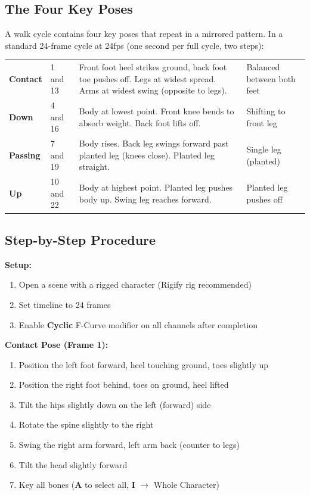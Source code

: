 \subsection{The Four Key Poses}

A walk cycle contains four key poses that repeat in a mirrored pattern. In a standard 24-frame cycle at 24fps (one second per full cycle, two steps):

\begin{center}
\begin{tabularx}{\textwidth}{L{2cm}C{1.5cm}L{4.5cm}X}
\toprule
{}
 &  &  &  \\
\midrule
\textbf{Contact} & 1 and 13 & Front foot heel strikes ground, back foot toe pushes off. Legs at widest spread. Arms at widest swing (opposite to legs). & Balanced between both feet \\
\textbf{Down} & 4 and 16 & Body at lowest point. Front knee bends to absorb weight. Back foot lifts off. & Shifting to front leg \\
\textbf{Passing} & 7 and 19 & Body rises. Back leg swings forward past planted leg (knees close). Planted leg straight. & Single leg (planted) \\
\textbf{Up} & 10 and 22 & Body at highest point. Planted leg pushes body up. Swing leg reaches forward. & Planted leg pushes off \\
\bottomrule
\end{tabularx}
\end{center}

\subsection{Step-by-Step Procedure}

\textbf{Setup:}
\begin{enumerate}[leftmargin=2em]
  \item Open a scene with a rigged character (Rigify rig recommended)
  \item Set timeline to 24 frames
  \item Enable \textbf{Cyclic} F-Curve modifier on all channels after completion
\end{enumerate}

\textbf{Contact Pose (Frame 1):}
\begin{enumerate}[leftmargin=2em]
  \item Position the left foot forward, heel touching ground, toes slightly up
  \item Position the right foot behind, toes on ground, heel lifted
  \item Tilt the hips slightly down on the left (forward) side
  \item Rotate the spine slightly to the right
  \item Swing the right arm forward, left arm back (counter to legs)
  \item Tilt the head slightly forward
  \item Key all bones (\textbf{A} to select all, \textbf{I} $\rightarrow$ Whole Character)
\end{enumerate}

